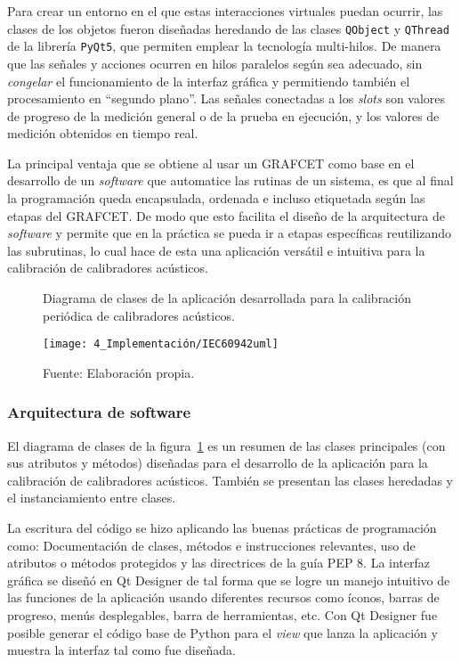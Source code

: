 Para crear un entorno en el que estas interacciones virtuales puedan ocurrir, las clases de los objetos fueron diseñadas heredando de las clases {\small \texttt{QObject}} y {\small \texttt{QThread}} de la librería {\small \texttt{PyQt5}}, que permiten emplear la tecnología multi-hilos.
De manera que las señales y acciones ocurren en hilos paralelos según sea adecuado, sin \emph{congelar} el funcionamiento de la interfaz gráfica y permitiendo también el procesamiento en ``segundo plano''.
Las señales conectadas a los \emph{slots} son valores de progreso de la medición general o de la prueba en ejecución, y los valores de medición obtenidos en tiempo real.

La principal ventaja que se obtiene al usar un GRAFCET como base en el desarrollo de un \emph{software} que automatice las rutinas de un sistema, es que al final la programación queda encapsulada, ordenada e incluso etiquetada según las etapas del GRAFCET. De modo que esto facilita el diseño de la arquitectura de \emph{software} y permite que en la práctica se pueda ir a etapas específicas reutilizando las subrutinas, lo cual hace de esta una aplicación versátil e intuitiva para la calibración de calibradores acústicos.

\vfill

\begin{figure}[!hp]
    \caption{Diagrama de clases de la aplicación desarrollada para la calibración periódica de calibradores acústicos.}
    \label{fig:uml_acoustic_calibrators}
    \centering
    \texttt{[image: 4\_Implementación/IEC60942uml]}
    \caption*{\footnotesize Fuente: Elaboración propia.}
\end{figure}

\subsubsection{Arquitectura de software}
%
El diagrama de clases de la figura~\ref{fig:uml_acoustic_calibrators} es un resumen de las clases principales (con sus atributos y métodos) diseñadas para el desarrollo de la aplicación para la calibración de calibradores acústicos.
También se presentan las clases heredadas y el instanciamiento entre clases.

La escritura del código se hizo aplicando las buenas prácticas de programación como: Documentación de clases, métodos e instrucciones relevantes, uso de atributos o métodos protegidos y las directrices de la guía PEP 8.
La interfaz gráfica se diseñó en Qt Designer de tal forma que se logre un manejo intuitivo de las funciones de la aplicación usando diferentes recursos como íconos, barras de progreso, menús desplegables, barra de herramientas, etc.
Con Qt Designer fue posible generar el código base de Python para el \emph{view} que lanza la aplicación y muestra la interfaz tal como fue diseñada.


